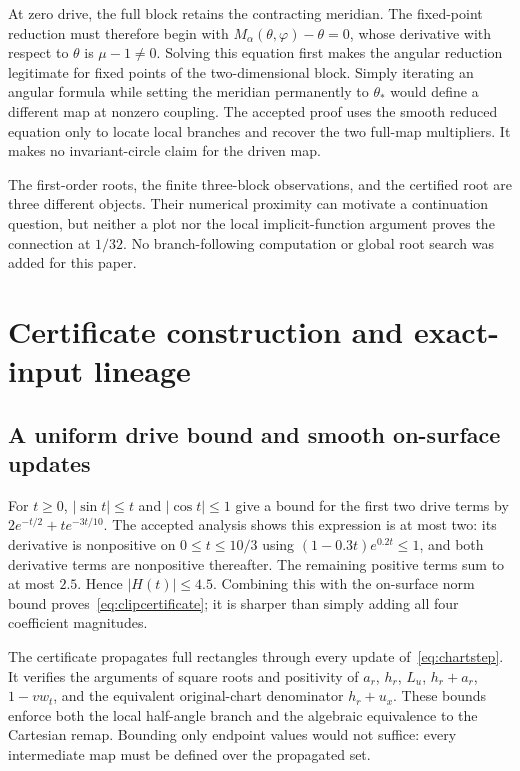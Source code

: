 \documentclass[11pt,a4paper]{article}
\numberwithin{equation}{section}
\begin{document}
At zero drive, the full block retains the contracting meridian. The fixed-point reduction must therefore begin with $M_\alpha(\theta,\varphi)-\theta=0$, whose derivative with respect to $\theta$ is $\mu-1\ne0$. Solving this equation first makes the angular reduction legitimate for fixed points of the two-dimensional block. Simply iterating an angular formula while setting the meridian permanently to $\theta_*$ would define a different map at nonzero coupling. The accepted proof uses the smooth reduced equation only to locate local branches and recover the two full-map multipliers. It makes no invariant-circle claim for the driven map.

The first-order roots, the finite three-block observations, and the certified root are three different objects. Their numerical proximity can motivate a continuation question, but neither a plot nor the local implicit-function argument proves the connection at $1/32$. No branch-following computation or global root search was added for this paper.

\section{Certificate construction and exact-input lineage}\label{app:arithmetic}
\subsection{A uniform drive bound and smooth on-surface updates}
For $t\ge0$, $|\sin t|\le t$ and $|\cos t|\le1$ give a bound for the first two drive terms by $2e^{-t/2}+te^{-3t/10}$. The accepted analysis shows this expression is at most two: its derivative is nonpositive on $0\le t\le10/3$ using $(1-0.3t)e^{0.2t}\le1$, and both derivative terms are nonpositive thereafter. The remaining positive terms sum to at most $2.5$. Hence $|H(t)|\le4.5$. Combining this with the on-surface norm bound proves~\eqref{eq:clipcertificate}; it is sharper than simply adding all four coefficient magnitudes.

The certificate propagates full rectangles through every update of~\eqref{eq:chartstep}. It verifies the arguments of square roots and positivity of $a_r$, $h_r$, $L_u$, $h_r+a_r$, $1-vw_t$, and the equivalent original-chart denominator $h_r+u_x$. These bounds enforce both the local half-angle branch and the algebraic equivalence to the Cartesian remap. Bounding only endpoint values would not suffice: every intermediate map must be defined over the propagated set.
\end{document}
